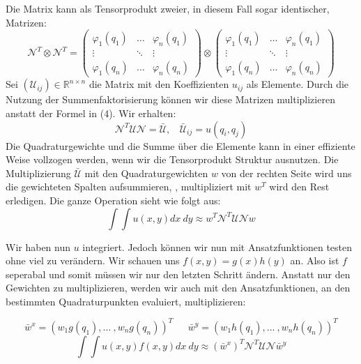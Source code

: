Die Matrix kann als Tensorprodukt zweier, in diesem Fall sogar identischer, Matrizen:
\begin{equation}
\mathcal{N}^T \otimes \mathcal{N}^T =
\begin{pmatrix}
\varphi_1(q_1) & \hdots & \varphi_n(q_1) \\
\vdots & \ddots & \vdots \\
\varphi_1(q_n) & \hdots & \varphi_n(q_n)
\end{pmatrix}
\otimes
\begin{pmatrix}
\varphi_1(q_1) & \hdots & \varphi_n(q_1) \\
\vdots & \ddots & \vdots \\
\varphi_1(q_n) & \hdots & \varphi_n(q_n)
\end{pmatrix}
\end{equation}
Sei $(\mathcal{U}_{ij}) \in \mathbb{R}^{n \times n}$ die Matrix mit den Koeffizienten $u_{ij}$ als Elemente.
Durch die Nutzung der Summenfaktorisierung können wir diese Matrizen multiplizieren anstatt der Formel in (4). Wir erhalten: 
\begin{equation}
\mathcal{N}^T \mathcal{U} \mathcal{N} = \bar{\mathcal{U}}, \ \ \ \ \bar{\mathcal{U}}_{ij} = u(q_i,q_j)
\end{equation}
Die Quadraturgewichte und die Summe über die Elemente kann in einer effiziente Weise vollzogen werden, wenn wir die Tensorprodukt Struktur ausnutzen. Die Multiplizierung $\bar{\mathcal{U}}$ mit den Quadraturgewichten $w$ von der rechten Seite wird uns die gewichteten Spalten aufsummieren, , multipliziert mit $w^T$ wird den Rest erledigen. Die ganze Operation sieht wie folgt aus: 
\begin{equation}
\int \int u(x,y) dx \ dy \approx w^T \mathcal{N}^T \mathcal{U} \mathcal{N} w
\end{equation} 

Wir haben nun $u$ integriert. Jedoch können wir nun mit Ansatzfunktionen testen ohne viel zu verändern.
Wir schauen uns $f(x,y)=g(x)h(y)$ an. Also ist $f$ seperabal und somit müssen wir nur den letzten Schritt ändern. Anstatt nur den Gewichten zu multiplizieren, werden wir auch mit den Ansatzfunktionen, an den bestimmten Quadraturpunkten evaluiert, multiplizieren:

\[\bar{w}^x=(w_1 g(q_1), ... \ ,w_n g(q_n))^T \ \ \ \ \ \ \ \bar{w}^y=(w_1 h(q_1), ... \ ,w_n h(q_n))^T\]
\begin{equation}
\int \int u(x,y) f(x,y) dx \ dy \approx (\bar{w}^x)^T \mathcal{N}^T \mathcal{U} \mathcal{N} \bar{w}^y
\end{equation}

